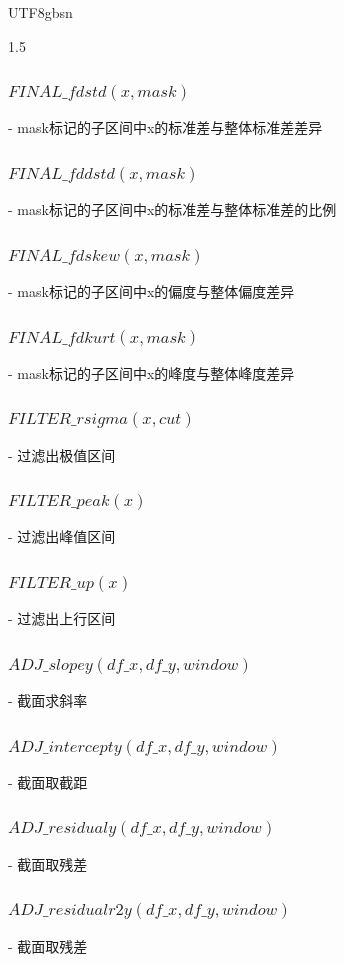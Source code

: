 \documentclass{article}
\begin{document}
\begin{CJK}{UTF8}{gbsn}
\begin{spacing}{1.5}
\subsubsection{$FINAL\_fdstd(x, mask)$}               
   - mask标记的子区间中x的标准差与整体标准差差异   
\subsubsection{$FINAL\_fddstd(x, mask)$}              
   - mask标记的子区间中x的标准差与整体标准差的比例 
\subsubsection{$FINAL\_fdskew(x, mask)$}              
   - mask标记的子区间中x的偏度与整体偏度差异       
\subsubsection{$FINAL\_fdkurt(x, mask)$}              
   - mask标记的子区间中x的峰度与整体峰度差异       
 \subsubsection{$FILTER\_rsigma(x, cut)$}              
   - 过滤出极值区间               
 \subsubsection{$FILTER\_peak(x)$}                     
   - 过滤出峰值区间                
 \subsubsection{$FILTER\_up(x)$}                       
   - 过滤出上行区间                 
 \subsubsection{$ADJ\_slopey(df\_x, df\_y, window)$}     
   - 截面求斜率  
 \subsubsection{$ADJ\_intercepty(df\_x, df\_y, window)$} 
   - 截面取截距  
 \subsubsection{$ADJ\_residualy(df\_x, df\_y, window)$}  
   - 截面取残差  
 \subsubsection{$ADJ\_residualr2y(df\_x, df\_y, window)$}  
   - 截面取残差  

\end{spacing}
\end{CJK}
\end{document}

